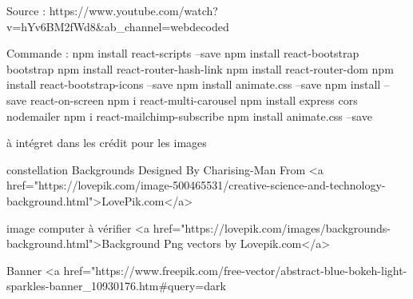 Source :
https://www.youtube.com/watch?v=hYv6BM2fWd8&ab_channel=webdecoded

Commande :
npm install react-scripts --save
npm install react-bootstrap bootstrap
npm install react-router-hash-link  
npm install react-router-dom 
npm install react-bootstrap-icons --save
npm install animate.css --save
npm install --save react-on-screen
npm i react-multi-carousel
npm install express cors nodemailer
npm i react-mailchimp-subscribe
npm install animate.css --save


à intégret dans les crédit pour les images

constellation
Backgrounds Designed By Charising-Man From <a href="https://lovepik.com/image-500465531/creative-science-and-technology-background.html">LovePik.com</a>

image computer à vérifier
<a href="https://lovepik.com/images/backgrounds-background.html">Background Png vectors by Lovepik.com</a>

Banner
<a href="https://www.freepik.com/free-vector/abstract-blue-bokeh-light-sparkles-banner_10930176.htm#query=dark%